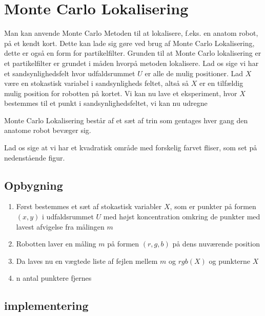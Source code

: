 \documentclass[../../SRP.tex]{subfiles}
\begin{document}
\chapter{Monte Carlo Lokalisering}

Man kan anvende Monte Carlo Metoden til at lokalisere, f.eks. en anatom robot, på et kendt kort. Dette kan lade sig gøre ved brug af Monte Carlo Lokalisering, dette er også en form for partikelfilter. Grunden til at Monte Carlo lokalisering er et partikelfilter er grundet i måden hvorpå metoden lokalisere. Lad os sige vi har et sandsynlighedsfelt hvor udfaldsrummet $U$ er alle de mulig positioner. Lad $X$ være en stokastisk variabel i sandsynligheds feltet, altså så $X$ er en tilfældig mulig position for robotten på kortet. Vi kan nu lave et eksperiment, hvor $X$ bestemmes til et punkt i sandsynlighedsfeltet, vi kan nu udregne 

Monte Carlo Lokalisering består af et sæt af trin som gentages hver gang den anatome robot bevæger sig. 

Lad os sige at vi har et kvadratisk område med forskelig farvet fliser, som set på nedenstående figur. \\

\section{Opbygning}

\begin{enumerate}
  \item Først bestemmes et sæt af stokastisk variabler $X$, som er punkter på formen $(x,y)$ i udfaldsrummet $U$ med højst koncentration omkring de punkter med lavest afvigelse fra målingen $m$

  \item Robotten laver en måling $m$ på formen $(r,g,b)$ på dens nuværende position

  \item Da laves nu en vægtede liste af fejlen mellem $m$ og $rgb(X)$ og punkterne $X$

  \item n antal punktere fjernes
\end{enumerate}

\section{implementering}
\end{document}
